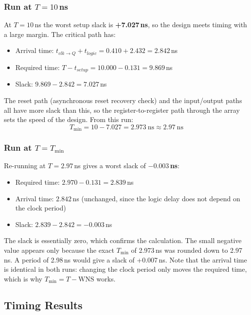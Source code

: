 \documentclass[11pt,a4paper]{article}
\begin{document}
\subsubsection{Run at $T = 10$\,ns}

At $T = 10$\,ns the worst setup slack is \textbf{+7.027\,ns}, so the design
meets timing with a large margin. The critical path has:

\begin{itemize}
  \item Arrival time: $t_{clk\to Q} + t_{logic} = 0.410 + 2.432 = 2.842$\,ns
  \item Required time: $T - t_{setup} = 10.000 - 0.131 = 9.869$\,ns
  \item Slack: $9.869 - 2.842 = 7.027$\,ns
\end{itemize}

The reset path (asynchronous reset recovery check) and the input/output paths
all have more slack than this, so the register-to-register path through
the array sets the speed of the design. From this run:
\[
  T_{\min} = 10 - 7.027 = 2.973\ \text{ns} \approx 2.97\ \text{ns}
\]

\subsubsection{Run at $T = T_{\min}$}

Re-running at $T = 2.97$\,ns gives a worst slack of \textbf{$-0.003$\,ns}:

\begin{itemize}
  \item Required time: $2.970 - 0.131 = 2.839$\,ns
  \item Arrival time: $2.842$\,ns (unchanged, since the logic delay does not
        depend on the clock period)
  \item Slack: $2.839 - 2.842 = -0.003$\,ns
\end{itemize}

The slack is essentially zero, which confirms the calculation. The small
negative value appears only because the exact $T_{\min}$ of 2.973\,ns was
rounded down to 2.97\,ns. A period of 2.98\,ns would give a slack of
+0.007\,ns. Note that the arrival time is identical in both runs: changing the
clock period only moves the required time, which is why
$T_{\min} = T - \text{WNS}$ works.

\subsection{Timing Results}
\end{document}
